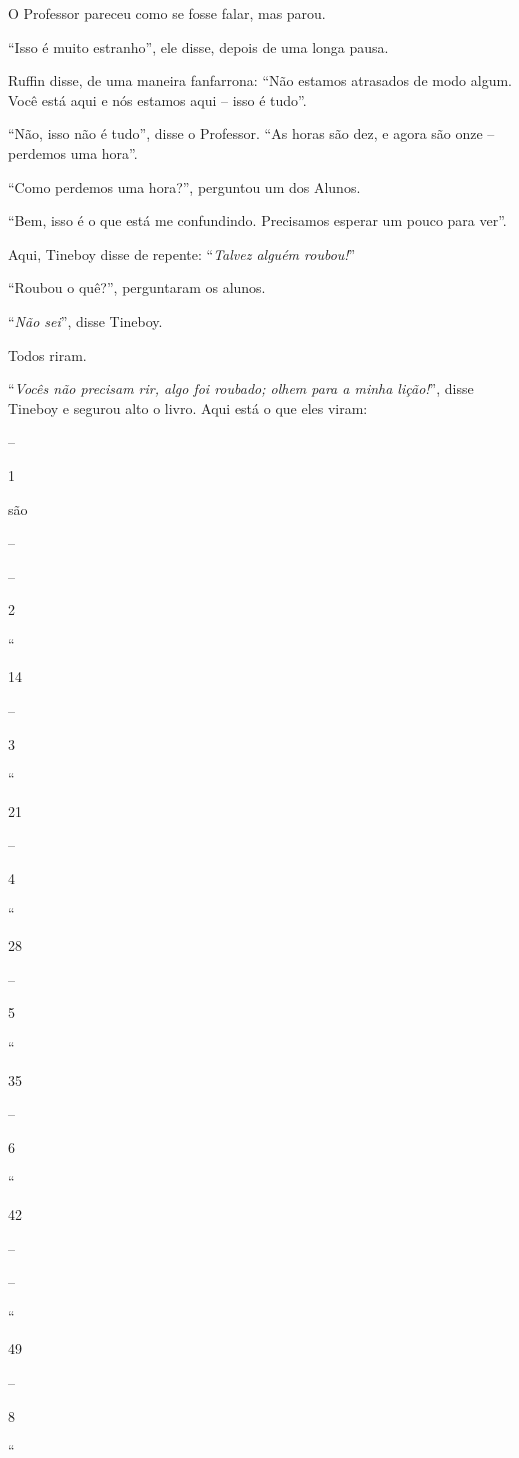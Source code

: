 O Professor pareceu como se fosse falar, mas parou.

``Isso é muito estranho'', ele disse, depois de uma longa pausa.

Ruffin disse, de uma maneira fanfarrona: ``Não estamos atrasados de modo
algum. Você está aqui e nós estamos aqui -- isso é tudo''.

``Não, isso não é tudo'', disse o Professor. ``As horas são dez, e agora
são onze -- perdemos uma hora''.

``Como perdemos uma hora?'', perguntou um dos Alunos.

``Bem, isso é o que está me confundindo. Precisamos esperar um pouco
para ver''.

Aqui, Tineboy disse de repente: ``\emph{Talvez alguém roubou!}''

``Roubou o quê?'', perguntaram os alunos.

``\emph{Não sei}'', disse Tineboy.

Todos riram.

``\emph{Vocês não precisam rir, algo foi roubado; olhem para a minha
lição!}'', disse Tineboy e segurou alto o livro. Aqui está o que eles
viram:

--

1

são

--

--

2

``

14

--

3

``

21

--

4

``

28

--

5

``

35

--

6

``

42

--

--

``

49

--

8

``

